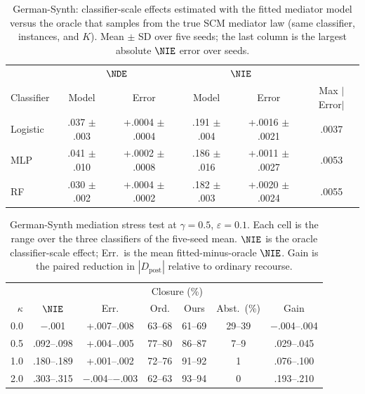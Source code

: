 \begin{table}[t]
\centering
\small
\caption{German-Synth: classifier-scale effects estimated with the fitted
mediator model versus the oracle that samples from the true SCM mediator law
(same classifier, instances, and $K$). Mean $\pm$ SD over five seeds; the
last column is the largest absolute $\NIE$ error over seeds.}
\label{tab:oracle}
\begin{tabular}{lccccc}
\hline
& \multicolumn{2}{c}{$\NDE$} & \multicolumn{2}{c}{$\NIE$} & \\
Classifier & Model & Error & Model & Error & Max $|$Error$|$ \\
\hline
Logistic & .037 $\pm$ .003 & +.0004 $\pm$ .0004 & .191 $\pm$ .004 & +.0016 $\pm$ .0021 & .0037 \\
MLP      & .041 $\pm$ .010 & +.0002 $\pm$ .0008 & .186 $\pm$ .016 & +.0011 $\pm$ .0027 & .0053 \\
RF       & .030 $\pm$ .002 & +.0004 $\pm$ .0002 & .182 $\pm$ .003 & +.0020 $\pm$ .0024 & .0055 \\
\hline
\end{tabular}
\end{table}

\begin{table}[t]
\centering
\small
\caption{German-Synth mediation stress test at $\gamma=0.5$,
$\varepsilon=0.1$. Each cell is the range over the three classifiers of the
five-seed mean. $\NIE$ is the oracle classifier-scale effect; Err.\ is the
mean fitted-minus-oracle $\NIE$. Gain is the paired reduction in
$|D_{\mathrm{post}}|$ relative to ordinary recourse.}
\label{tab:stress}
\setlength{\tabcolsep}{3pt}
\begin{tabular}{rcccccc}
\hline
& & & \multicolumn{2}{c}{Closure (\%)} & & \\
$\kappa$ & $\NIE$ & Err. & Ord. & Ours & Abst.\ (\%) & Gain \\
\hline
0.0 & $-$.001       & +.007--.008      & 63--68 & 61--69 & 29--39 & $-$.004--.004 \\
0.5 & .092--.098    & +.004--.005      & 77--80 & 86--87 & 7--9   & .029--.045 \\
1.0 & .180--.189    & +.001--.002      & 72--76 & 91--92 & 1      & .076--.100 \\
2.0 & .303--.315    & $-$.004--$-$.003 & 62--63 & 93--94 & 0      & .193--.210 \\
\hline
\end{tabular}
\end{table}

